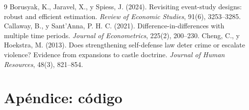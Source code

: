 \documentclass[11pt,a4paper]{article}
\begin{document}
\begin{thebibliography}{9}
 Borusyak, K., Jaravel, X., y Spiess, J. (2024). Revisiting event-study designs: robust and efficient estimation. \textit{Review of Economic Studies}, 91(6), 3253--3285.
 Callaway, B., y Sant'Anna, P. H. C. (2021). Difference-in-differences with multiple time periods. \textit{Journal of Econometrics}, 225(2), 200--230.
 Cheng, C., y Hoekstra, M. (2013). Does strengthening self-defense law deter crime or escalate violence? Evidence from expansions to castle doctrine. \textit{Journal of Human Resources}, 48(3), 821--854.
\end{thebibliography}

\newpage
\appendix
\section*{Apéndice: código}

\end{document}
